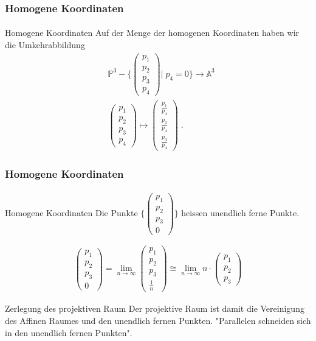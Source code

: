 \documentclass{beamer}
\begin{document}
\begin{frame}
    \frametitle{Homogene Koordinaten}
\framesubtitle{}
\begin{block}{Homogene Koordinaten}
Auf der Menge der homogenen Koordinaten haben wir die Umkehrabbildung
\begin{align*}
& \mathbb{P}^3 - \Biggl \{\begin{pmatrix} p_1 \\ p_2 \\ p_3  \\ p_4 \end{pmatrix}\Bigg | \; p_{4} = 0 \Biggr \}   \to \mathbb{A}^3 \\
& \begin{pmatrix} p_1 \\ p_2 \\ p_3  \\  p_{4} \end{pmatrix}   \mapsto \begin{pmatrix}  \frac{p_1}{ p_{4}} \\ \frac{p_2}{ p_{4}}  \\ \frac{p_3}{ p_{4}}  \end{pmatrix}  \; .
\end{align*}
\end{block}
\end{frame}


\begin{frame}
    \frametitle{Homogene Koordinaten}
\framesubtitle{}
\begin{block}{Homogene Koordinaten}
Die Punkte $ \Biggl \{ \begin{pmatrix} p_1 \\ p_2 \\ p_3  \\ 0 \end{pmatrix} \Biggr \} $ heissen unendlich ferne Punkte.

\begin{align*}
 \begin{pmatrix} p_1 \\ p_2 \\ p_3  \\ 0 \end{pmatrix}  =\lim_{n \to \infty} \begin{pmatrix} p_1 \\ p_2 \\ p_3  \\ \frac{1}{n} \end{pmatrix}  \cong  \lim_{n \to \infty} n \cdot  \begin{pmatrix} p_1 \\ p_2 \\ p_3 \end{pmatrix} 
\end{align*}
\end{block}

\begin{block}{Zerlegung des projektiven Raum}
Der projektive Raum ist damit die Vereinigung des Affinen Raumes und den unendlich fernen Punkten. "Parallelen schneiden sich in den unendlich fernen Punkten".
\end{block}
\end{frame}
\end{document}
